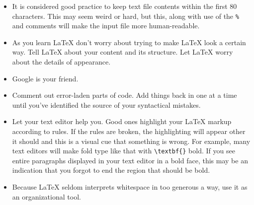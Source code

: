 \begin{itemize}

\item It is considered good practice to keep text file contents within the first
  80 characters. This may seem weird or hard, but this, along with use of the
  \texttt{\%} and comments will make the input file more human-readable.
    \item As you learn \LaTeX{} don't worry about trying to make
      \LaTeX{} look a certain way. Tell \LaTeX{} about your content
      and its structure. Let \LaTeX{} worry about the details of
      appearance.

    \item Google is your friend.

    \item Comment out error-laden parts of code. Add things back in one at a
      time until you've identified the source of your syntactical mistakes.

    \item Let your text editor help you. Good ones highlight your \LaTeX{}
      markup according to rules. If the rules are broken, the highlighting will
      appear other it should and this is a visual cue that something is
      wrong. For example, many text editors will make fold type like that with
      \verb=\textbf{}= bold. If you see entire paragraphs displayed in your text
      editor in a bold face, this may be an indication that you forgot to end
      the region that should be bold.

    \item Because \LaTeX{} seldom interprets whitespace in too generous a way,
      use it as an organizational tool.

\end{itemize}


